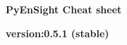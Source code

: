 \documentclass[9pt,landscape]{article}
\begin{document}
\raggedright
\footnotesize

\begin{center}
     \Huge{\textbf{PyEnSight Cheat sheet}} \\
\end{center}
\begin{center}
     \small{\textbf{version:0.5.1 (stable)}} \\
\end{center}

\vspace{-0.5cm}
\noindent\makebox[\linewidth]{\rule{\paperwidth}{2pt}}
\end{document}
